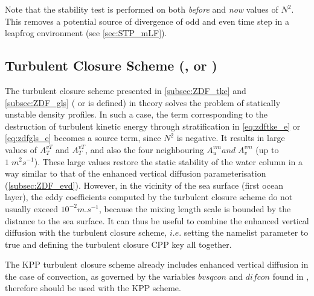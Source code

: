 \documentclass[../main/NEMO_manual]{subfiles}
\begin{document}
Note that the stability test is performed on both \textit{before} and \textit{now} values of $N^2$.
This removes a potential source of divergence of odd and even time step in
a leapfrog environment \citep{Leclair_PhD2010} (see \autoref{sec:STP_mLF}).

\subsection[Turbulent closure scheme (\protect\key{zdf}\{tke,gls,osm\})]{Turbulent Closure Scheme (\protect{}, \protect{} or \protect{})}
\label{subsec:ZDF_tcs}

The turbulent closure scheme presented in \autoref{subsec:ZDF_tke} and \autoref{subsec:ZDF_gls}
( or  is defined) in theory solves the problem of statically unstable density profiles.
In such a case, the term corresponding to the destruction of turbulent kinetic energy through stratification in
\autoref{eq:zdftke_e} or \autoref{eq:zdfgls_e} becomes a source term, since $N^2$ is negative. 
It results in large values of $A_T^{vT}$ and  $A_T^{vT}$, and also the four neighbouring $A_u^{vm} {and}\;A_v^{vm}$
(up to $1\;m^2s^{-1}$).
These large values restore the static stability of the water column in a way similar to that of
the enhanced vertical diffusion parameterisation (\autoref{subsec:ZDF_evd}).
However, in the vicinity of the sea surface (first ocean layer), the eddy coefficients computed by
the turbulent closure scheme do not usually exceed $10^{-2}m.s^{-1}$,
because the mixing length scale is bounded by the distance to the sea surface.
It can thus be useful to combine the enhanced vertical diffusion with the turbulent closure scheme,
$i.e.$ setting the  namelist parameter to true and
defining the turbulent closure CPP key all together.

The KPP turbulent closure scheme already includes enhanced vertical diffusion in the case of convection,
as governed by the variables $bvsqcon$ and $difcon$ found in ,
therefore  should be used with the KPP scheme.

\end{document}
